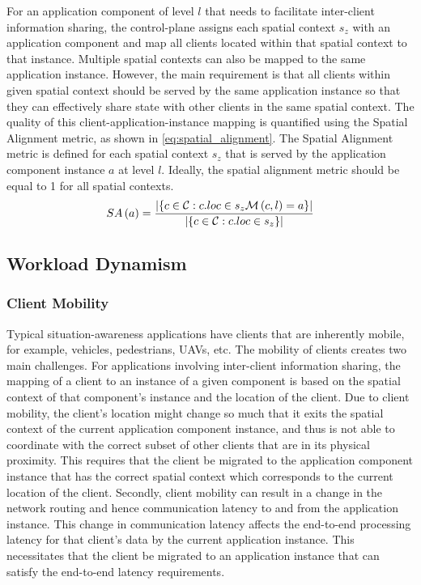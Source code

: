For an application component of level $l$ that needs to facilitate inter-client information sharing, the control-plane assigns each spatial context $s_z$ with an application component and map all clients located within that spatial context to that instance. Multiple spatial contexts can also be mapped to the same application instance. However, the main requirement is that all clients within given spatial context should be served by the same application instance so that they can effectively share state with other clients in the same spatial context. The quality of this client-application-instance mapping is quantified using the Spatial Alignment metric, as shown in \cref{eq:spatial_alignment}. The Spatial Alignment metric is defined for each spatial context $s_z$ that is served by the application component instance $a$ at level $l$.  Ideally, the spatial alignment metric should be equal to 1 for all spatial contexts.
\begin{equation}
\label{eq:spatial_alignment}
SA \left( a \right) = \dfrac{|\{ c \in \mathcal{C} : c.loc \in s_z   \mathcal{M} \left( c, l\right) = a \}|}{|\{ c \in \mathcal{C} : c.loc \in s_z \}|}
\end{equation}

\subsection{Workload Dynamism}

\subsubsection{Client Mobility}
Typical situation-awareness applications have clients that are inherently mobile, for example, vehicles, pedestrians, UAVs, etc. The mobility of clients creates two main challenges. For applications involving inter-client information sharing, the mapping of a client to an instance of a given component is based on the spatial context of that component's instance and the location of the client. Due to client mobility, the client's location might change so much that it exits the spatial context of the current application component instance, and thus is not able to coordinate with the correct subset of other clients that are in its physical proximity. This requires that the client be migrated to the application component instance that has the correct spatial context which corresponds to the current location of the client. Secondly, client mobility can result in a change in the network routing and hence communication latency to and from the application instance. This change in communication latency affects the end-to-end processing latency for that client's data by the current application instance. This necessitates that the client be migrated to an application instance that can satisfy the end-to-end latency requirements.

